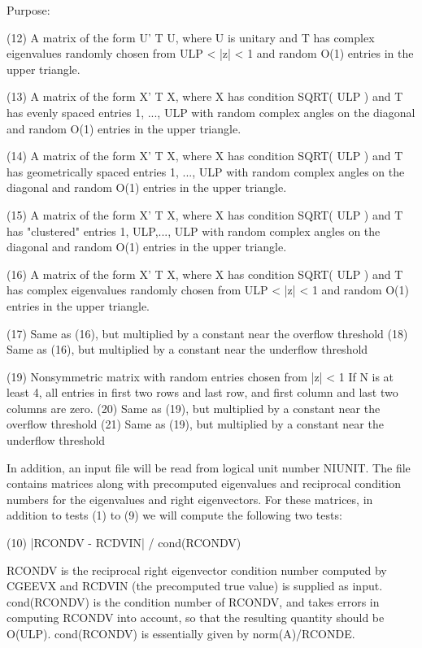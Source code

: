 \begin{DoxyParagraph}{Purpose\+: }
\begin{DoxyVerb}
    (12) A matrix of the form  U' T U, where U is unitary and
         T has complex eigenvalues randomly chosen from
         ULP < |z| < 1   and random O(1) entries in the upper
         triangle.

    (13) A matrix of the form  X' T X, where X has condition
         SQRT( ULP ) and T has evenly spaced entries 1, ..., ULP
         with random complex angles on the diagonal and random O(1)
         entries in the upper triangle.

    (14) A matrix of the form  X' T X, where X has condition
         SQRT( ULP ) and T has geometrically spaced entries
         1, ..., ULP with random complex angles on the diagonal
         and random O(1) entries in the upper triangle.

    (15) A matrix of the form  X' T X, where X has condition
         SQRT( ULP ) and T has "clustered" entries 1, ULP,..., ULP
         with random complex angles on the diagonal and random O(1)
         entries in the upper triangle.

    (16) A matrix of the form  X' T X, where X has condition
         SQRT( ULP ) and T has complex eigenvalues randomly chosen
         from ULP < |z| < 1 and random O(1) entries in the upper
         triangle.

    (17) Same as (16), but multiplied by a constant
         near the overflow threshold
    (18) Same as (16), but multiplied by a constant
         near the underflow threshold

    (19) Nonsymmetric matrix with random entries chosen from |z| < 1
         If N is at least 4, all entries in first two rows and last
         row, and first column and last two columns are zero.
    (20) Same as (19), but multiplied by a constant
         near the overflow threshold
    (21) Same as (19), but multiplied by a constant
         near the underflow threshold

    In addition, an input file will be read from logical unit number
    NIUNIT. The file contains matrices along with precomputed
    eigenvalues and reciprocal condition numbers for the eigenvalues
    and right eigenvectors. For these matrices, in addition to tests
    (1) to (9) we will compute the following two tests:

   (10)  |RCONDV - RCDVIN| / cond(RCONDV)

      RCONDV is the reciprocal right eigenvector condition number
      computed by CGEEVX and RCDVIN (the precomputed true value)
      is supplied as input. cond(RCONDV) is the condition number of
      RCONDV, and takes errors in computing RCONDV into account, so
      that the resulting quantity should be O(ULP). cond(RCONDV) is
      essentially given by norm(A)/RCONDE.


\end{DoxyVerb}
\end{DoxyParagraph}

